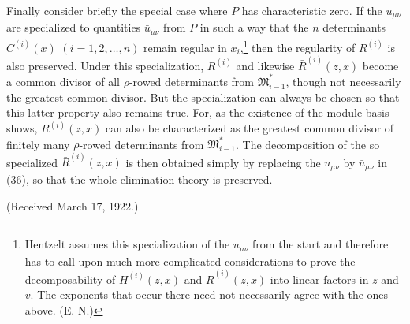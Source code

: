 \documentclass[11pt]{article}
\providecommand{\D}{\Delta}
\providecommand{\dd}{\mathrm d}
\providecommand{\dd}{\mathrm d}
\providecommand{\ma}{\mathfrak{a}}
\providecommand{\mb}{\mathfrak{b}}
\providecommand{\mo}{\mathfrak{o}}
\providecommand{\mS}{\mathfrak{S}}
\providecommand{\Mmod}{\mathfrak M}
\providecommand{\mS}{\mathfrak{S}}
\providecommand{\mo}{\mathfrak{o}}
\providecommand{\Om}{\Omega}
\begin{document}
Finally consider briefly the special case where $P$ has characteristic zero. If the $u_{\mu\nu}$ are specialized to quantities $\bar u_{\mu\nu}$ from $P$ in such a way that the $n$ determinants $C^{(i)}(x)$ $(i=1,2,
\ldots,n)$ remain regular in $x_i$,\footnote{Hentzelt assumes this specialization of the $u_{\mu\nu}$ from the start and therefore has to call upon much more complicated considerations to prove the decomposability of $H^{(i)}(z,x)$ and $\bar R^{(i)}(z,x)$ into linear factors in $z$ and $v$. The exponents that occur there need not necessarily agree with the ones above. (E. N.)} then the regularity of $R^{(i)}$ is also preserved. Under this specialization, $R^{(i)}$ and likewise $\bar R^{(i)}(z,x)$ become a common divisor of all $\rho$-rowed determinants from $\Mmod^*_{i-1}$, though not necessarily the greatest common divisor. But the specialization can always be chosen so that this latter property also remains true. For, as the existence of the module basis shows, $R^{(i)}(z,x)$ can also be characterized as the greatest common divisor of finitely many $\rho$-rowed determinants from $\Mmod^*_{i-1}$. The decomposition of the so specialized $\bar R^{(i)}(z,x)$ is then obtained simply by replacing the $u_{\mu\nu}$ by $\bar u_{\mu\nu}$ in (36), so that the whole elimination theory is preserved.

\begin{center}
(Received March 17, 1922.)
\end{center}


\providecommand{\mJ}{\mathfrak J}
\providecommand{\mS}{\mathfrak S}
\providecommand{\mo}{\mathfrak o}
\providecommand{\ma}{\mathfrak a}
\providecommand{\mb}{\mathfrak b}
\providecommand{\dd}{\mathrm d}
\providecommand{\D}{\Delta}
\providecommand{\Om}{\Omega}
\providecommand{\dx}{\dd x}
\providecommand{\dy}{\dd y}
\end{document}
